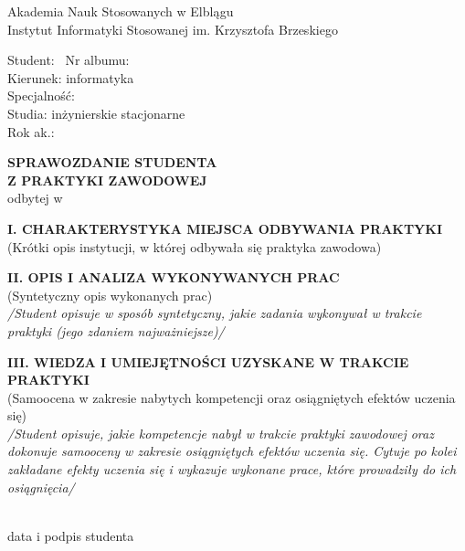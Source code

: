 \documentclass[11pt,a4paper]{article}
\begin{document}
\noindent
Akademia Nauk Stosowanych w Elblągu \\
Instytut Informatyki Stosowanej im. Krzysztofa Brzeskiego

\vspace{2em}

\noindent Student: \dotfill\ Nr albumu: \dotfill \\
Kierunek: informatyka \\
Specjalność: \dotfill \\
Studia: inżynierskie stacjonarne \\
Rok ak.: \dotfill

\vspace{3em}

\begin{center}
\textbf{\large SPRAWOZDANIE STUDENTA} \\[0.5em]
\textbf{\large Z PRAKTYKI ZAWODOWEJ} \\[1em]
odbytej w \dotfill \\
\dotfill
\end{center}

\vspace{3em}

\noindent \textbf{I. CHARAKTERYSTYKA MIEJSCA ODBYWANIA PRAKTYKI} \\
{\small (Krótki opis instytucji, w której odbywała się praktyka zawodowa)}

\vspace{4em}

\noindent \textbf{II. OPIS I ANALIZA WYKONYWANYCH PRAC} \\
{\small (Syntetyczny opis wykonanych prac)} \\[0.5em]
{\small\textit{/Student opisuje w sposób syntetyczny, jakie zadania wykonywał w trakcie praktyki (jego zdaniem najważniejsze)/}}

\vspace{6em}

\noindent \textbf{III. WIEDZA I UMIEJĘTNOŚCI UZYSKANE W TRAKCIE PRAKTYKI} \\
{\small (Samoocena w zakresie nabytych kompetencji oraz osiągniętych efektów uczenia się)} \\[0.5em]
{\small\textit{/Student opisuje, jakie kompetencje nabył w trakcie praktyki zawodowej oraz dokonuje samooceny w zakresie osiągniętych efektów uczenia się. Cytuje po kolei zakładane efekty uczenia się i wykazuje wykonane prace, które prowadziły do ich osiągnięcia/}}

\vspace{10em}

\noindent\hfill
\begin{minipage}[t]{0.45\textwidth}
\centering
\dotfill \\
\small data i podpis studenta
\end{minipage}
\end{document}

